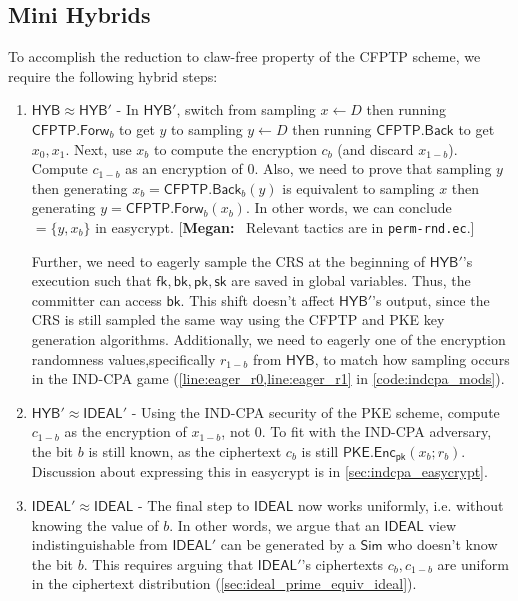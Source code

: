 \documentclass{article}[12pt]
\newcommand{\authnote}[2]{[{\color{red}\textbf{#1:}}~{\color{blue} #2}]}
\newcommand{\authnote}[2]{}
\newcommand{\megan}[1]{\authnote{Megan}{#1}}
\newcommand{\code}[1]{\texttt{#1}} %
\newcommand{\PKE}{\mathsf{PKE}}
\newcommand{\Enc}{\mathsf{Enc}}
\newcommand{\EncKey}{\mathsf{pk}}
\newcommand{\DecKey}{\mathsf{sk}}
\newcommand{\CFPTP}{\mathsf{CFPTP}}
\newcommand{\Forw}{\mathsf{Forw}}
\newcommand{\Back}{\mathsf{Back}}
\newcommand{\ForwKey}{\mathsf{fk}}
\newcommand{\BackKey}{\mathsf{bk}}
\newcommand{\Domain}{D}
\newcommand{\Simulator}{{\mathsf{Sim}}} %
\newcommand{\Ideal}{{\mathsf{IDEAL}}}
\newcommand{\Hyb}{{\mathsf{HYB}}}
\begin{document}
\subsection{Mini Hybrids}
To accomplish the reduction to claw-free property of the CFPTP scheme, we require the following hybrid steps:
\begin{enumerate}
	\item\label{hyb:2.1} $\Hyb \approx \Hyb'$ - In $\Hyb'$, switch from sampling $x\gets \Domain$ then running $\CFPTP.\Forw_b$ to get $y$ to sampling $y \gets \Domain$ then running $\CFPTP.\Back$ to get $x_0,x_1$. Next, use $x_b$ to compute the encryption $c_b$ (and discard $x_{1-b}$). Compute $c_{1-b}$ as an encryption of $0$.
	Also, we need to prove that sampling $y$ then generating $x_b = \CFPTP.\Back_b(y)$ is equivalent to sampling $x$ then generating $y = \CFPTP.\Forw_b(x_b)$. In other words, we can conclude ${=\{y, x_b\}}$ in easycrypt. \megan{Relevant tactics are in \code{perm-rnd.ec}.}

	Further, we need to eagerly sample the CRS at the beginning of $\Hyb'$'s execution such that $\ForwKey, \BackKey, \EncKey, \DecKey$ are saved in global variables. Thus, the committer can access $\BackKey$. This shift doesn't affect $\Hyb'$'s output, since the CRS is still sampled the same way using the CFPTP and PKE key generation algorithms. Additionally, we need to eagerly one of the encryption randomness values,specifically $r_{1-b}$ from $\Hyb$, to match how sampling occurs in the IND-CPA game (\cref{line:eager_r0,line:eager_r1} in \cref{code:indcpa_mods}).

	\item\label{hyb:2.2} $\Hyb' \approx \Ideal'$ - Using the IND-CPA security of the PKE scheme, compute $c_{1-b}$ as the encryption of $x_{1-b}$, not $0$. To fit with the IND-CPA adversary, the bit $b$ is still known, as the ciphertext $c_b$ is still $\PKE.\Enc_{\EncKey}(x_b; r_b)$. Discussion about expressing this in easycrypt is in \cref{sec:indcpa_easycrypt}.

	\item\label{hyb:2.3} $\Ideal' \approx \Ideal$ - The final step to $\Ideal$ now works uniformly, i.e. without knowing the value of $b$. In other words, we argue that an $\Ideal$ view indistinguishable from $\Ideal'$ can be generated by a $\Simulator$ who doesn't know the bit $b$. This requires arguing that $\Ideal'$'s ciphertexts $c_b, c_{1-b}$ are uniform in the ciphertext distribution (\cref{sec:ideal_prime_equiv_ideal}).
\end{enumerate}
\end{document}
